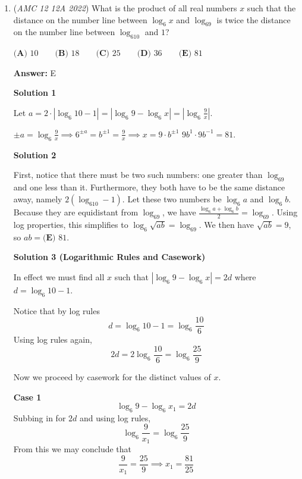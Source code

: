 \begin{enumerate}
 In general, for $1,\ldots,2n$, the same logic yields answer: $\left\lfloor\dfrac{n}{2}\right\rfloor! \cdot \left\lceil\dfrac{n}{2}\right\rceil!$



	\item (\textit{AMC 12 12A 2022}) What is the product of all real numbers $x$ such that the distance on the number line between $\log_6x$ and $\log_69$ is twice the distance on the number line between $\log_610$ and $1$?


 $\textbf{(A) } 10 \qquad \textbf{(B) } 18 \qquad \textbf{(C) } 25 \qquad \textbf{(D) } 36 \qquad \textbf{(E) } 81$

 \textbf{Answer: }E



\textbf{Solution 1}

Let $a = 2 \cdot |\log_6 10 - 1| = |\log_6 9 - \log_6 x|  =  \left|\log_6 \frac{9}{x}\right|$.

 $\pm a = \log_6 \frac{9}{x} \implies 6^{\pm a} = b^{\pm 1} = \frac{9}{x}  \implies x = 9 \cdot b^{\pm 1}$
$9b^1 \cdot 9b^{-1} = \boxed{81}$.

 



\textbf{Solution 2}

First, notice that there must be two such numbers: one greater than $\log_69$ and one less than it. Furthermore, they both have to be the same distance away, namely $2(\log_610 - 1)$. Let these two numbers be $\log_6a$ and $\log_6b$. Because they are equidistant from $\log_69$, we have $\frac{\log_6a + \log_6b}{2} = \log_69$. Using log properties, this simplifies to $\log_6{\sqrt{ab}} = \log_69$. We then have $\sqrt{ab} = 9$, so $ab = \boxed{\textbf{(E) } 81}$.

 



\textbf{Solution 3 (Logarithmic Rules and Casework)}

In effect we must find all $x$ such that $\left|\log_6 9 - \log_6 x\right| = 2d$ where $d = \log_6 10 - 1$.

 Notice that by log rules
 \[d = \log_6 10 - 1 = \log_6 \frac{10}{6}\]Using log rules again,
 \[2d = 2\log_6 \frac{10}{6} = \log_6 \frac{25}{9}\]

 Now we proceed by casework for the distinct values of $x$.

 \textbf{Case 1} 
 \[\log_6 9 - \log_6 x_1 = 2d\]Subbing in for $2d$ and using log rules,
 \[\log_6 \frac{9}{x_1} = \log_6 \frac{25}{9}\]From this we may conclude that
 \[\frac{9}{x_1} = \frac{25}{9} \implies x_1 = \frac{81}{25}\]


\end{enumerate}
